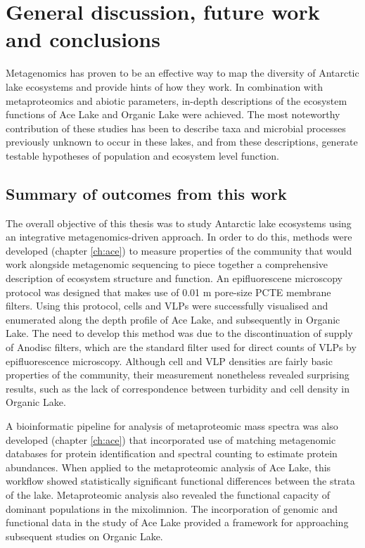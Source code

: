 \chapter{General discussion, future work and conclusions}
\label{ch:conc}
\acresetall

Metagenomics has proven to be an effective way to map the diversity of Antarctic lake ecosystems and provide hints of how they work.
In combination with metaproteomics and abiotic parameters, in-depth descriptions of the ecosystem functions of Ace Lake and Organic Lake were achieved.
The most noteworthy contribution of these studies has been to describe taxa and microbial processes previously unknown to occur in these lakes, and from these descriptions, generate testable hypotheses of population and ecosystem level function.

\section{Summary of outcomes from this work}
The overall objective of this thesis was to study Antarctic lake ecosystems using an integrative metagenomics-driven approach.
In order to do this, methods were developed (chapter \ref{ch:ace}) to measure properties of the community that would work alongside metagenomic sequencing to piece together a comprehensive description of ecosystem structure and function.
An epifluorescene microscopy protocol was designed that makes use of 0.01 \textmu{}m pore-size \ac{PCTE} membrane filters.
Using this protocol, cells and \acp{VLP} were successfully visualised and enumerated along the depth profile of Ace Lake, and subsequently in Organic Lake.
The need to develop this method was due to the discontinuation of supply of Anodisc filters, which are the standard filter used for direct counts of \acp{VLP} by epifluorescence microscopy.
Although cell and \ac{VLP} densities are fairly basic properties of the community, their measurement nonetheless revealed surprising results, such as the lack of correspondence between turbidity and cell density in Organic Lake.

A bioinformatic pipeline for analysis of metaproteomic mass spectra was also developed (chapter \ref{ch:ace}) that incorporated use of matching metagenomic databases for protein identification and spectral counting to estimate protein abundances.
When applied to the metaproteomic analysis of Ace Lake, this workflow showed statistically significant functional differences between the strata of the lake.
Metaproteomic analysis also revealed the functional capacity of dominant populations in the mixolimnion.
The incorporation of genomic and functional data in the study of Ace Lake provided a framework for approaching subsequent studies on Organic Lake.

